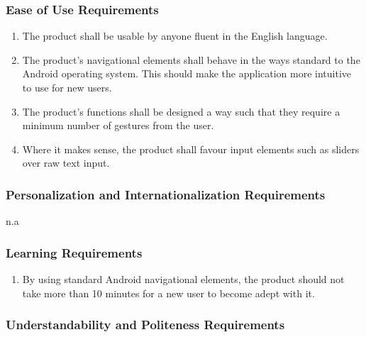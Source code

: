 \documentclass[]{article}
\begin{document}
\subsubsection{Ease of Use Requirements}
\label{ssub:ease_of_use_requirements}
\begin{enumerate}[{UH}1. ]
	\item The product shall be usable by anyone fluent in the English language.
	\item The product's navigational elements shall behave in the ways standard to the Android operating system. This should make the application more intuitive to use for new users. 
	\item The product's functions shall be designed a way such that they require a minimum number of gestures from the user.
	\item Where it makes sense, the product shall favour input elements such as sliders over raw text input.
	\holdEnum
\end{enumerate}

\subsubsection{Personalization and Internationalization Requirements}
\label{ssub:personalization_and_internationalization_requirements}
n.a

\subsubsection{Learning Requirements}
\label{ssub:learning_requirements}
\begin{enumerate}[{UH}1. ]
	\resumeEnum
	\item By using standard Android navigational elements, the product should not take more than 10 minutes for a new user to become adept with it.
	\holdEnum
\end{enumerate}

\subsubsection{Understandability and Politeness Requirements}
\label{ssub:understandability_and_politeness_requirements}
\end{document}
